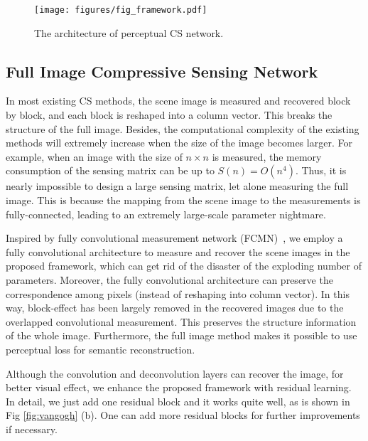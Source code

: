 \documentclass[runningheads]{llncs}
\begin{document}
\begin{figure*}[!h]
  \centering
  \texttt{[image: figures/fig\_framework.pdf]}\\
  \caption{The architecture of perceptual CS network.}
  \label{fig:framework}
\end{figure*}

\subsection{Full Image Compressive Sensing Network}

In most existing CS methods, the scene image is measured and recovered block by block, and each block is reshaped into a column vector.
This breaks the structure of the full image. Besides, the computational complexity of the existing methods will extremely increase when the size of the image becomes larger.
For example, when an image with the size of $n\times n$ is measured, the memory consumption of the sensing matrix can be up to $S(n)=O(n^4)$.
Thus, it is nearly impossible to design a large sensing matrix, let alone measuring the full image. %
This is because the mapping from the scene image to the measurements is fully-connected, leading to an extremely large-scale parameter nightmare.

Inspired by fully convolutional measurement network (FCMN)~\cite{xie2017Fully},
we employ a fully convolutional architecture to measure and recover the scene images in the proposed framework,
which can get rid of the disaster of the exploding number of parameters.
Moreover, the fully convolutional architecture can preserve the correspondence among pixels (instead of reshaping into column vector).
In this way, block-effect has been largely removed in the recovered images due to the overlapped convolutional measurement.
This preserves the structure information of the whole image. Furthermore, the full image method makes it possible to use perceptual loss for semantic reconstruction.

Although the convolution and deconvolution layers can recover the image, for better visual effect, we enhance the proposed framework with residual learning. %
In detail, we just add one residual block and it works quite well, as is shown in Fig \ref{fig:vangogh} (b).
One can add more residual blocks for further improvements if necessary. %
\end{document}
